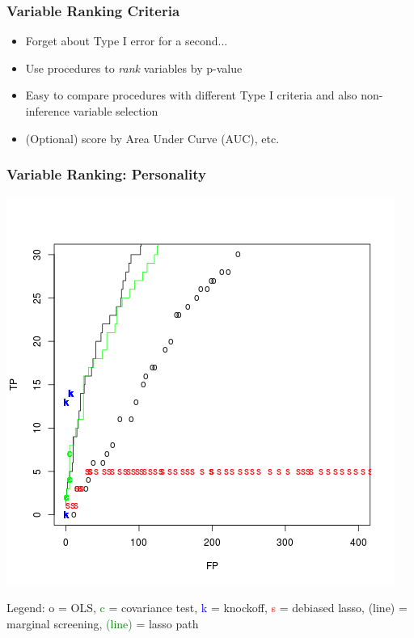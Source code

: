\documentclass{beamer}
\begin{document}
\begin{frame}
\frametitle{Variable Ranking Criteria}
\begin{itemize}
\item Forget about Type I error for a second... 
\item Use procedures to \emph{rank} variables by p-value
\item Easy to compare procedures with different Type I criteria and also non-inference variable selection
\item (Optional) score by Area Under Curve (AUC), etc.
\end{itemize}
\end{frame}

\begin{frame}
\frametitle{Variable Ranking: Personality}
\begin{center}
\includegraphics[scale = 0.35]{pf16_tvf.png}
\end{center}

Legend: o = OLS, \textcolor{green}{c} = covariance test,
\textcolor{blue}{k} = knockoff, \textcolor{red}{s} = debiased lasso,
(line) = marginal screening, \textcolor{green}{(line)} = lasso path
\end{frame}
\end{document}
